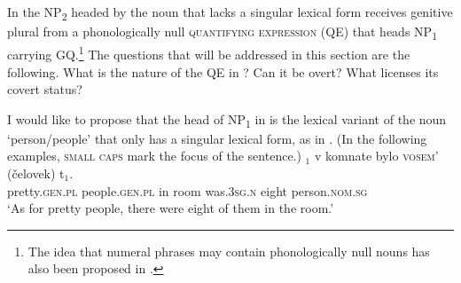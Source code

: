 \documentclass[output=paper,
modfonts,
newtxmath,
hidelinks
]{langscibook}
\begin{document}
\z


\noindent In  the NP\textsubscript{2} headed by the noun that lacks a singular lexical form receives genitive plural from a phonologically null \textsc{quantifying expression} (QE) that heads NP\textsubscript{1} carrying GQ.\footnote{\label{18:fn10}The idea that numeral phrases may contain phonologically null nouns has also been proposed in \citet{Kayne2005}.}
The questions that will be addressed in this section are the following. What is the nature of the QE in ? Can it be overt? What licenses its covert status?  

I would like to propose that the head of NP\textsubscript{1} in  is the lexical variant of the noun ‘person/people’ that only has a singular lexical form, as in . (In the following examples, \textsc{small caps} mark the focus of the sentence.)
\ea \label{18:ex15}
	$_1$ v  komnate  bylo   \textsc{vosem’} {(čelovek)  \hspace{1cm}t$_1$}.\\
 	{} pretty.\textsc{gen.pl} people.\textsc{gen.pl} in room was.\textsc{3sg.n} eight  \hspace{2pt}person.\textsc{nom.sg}\\
	\glt `As for pretty people, there were eight of them in the room.'
\z
\end{document}
